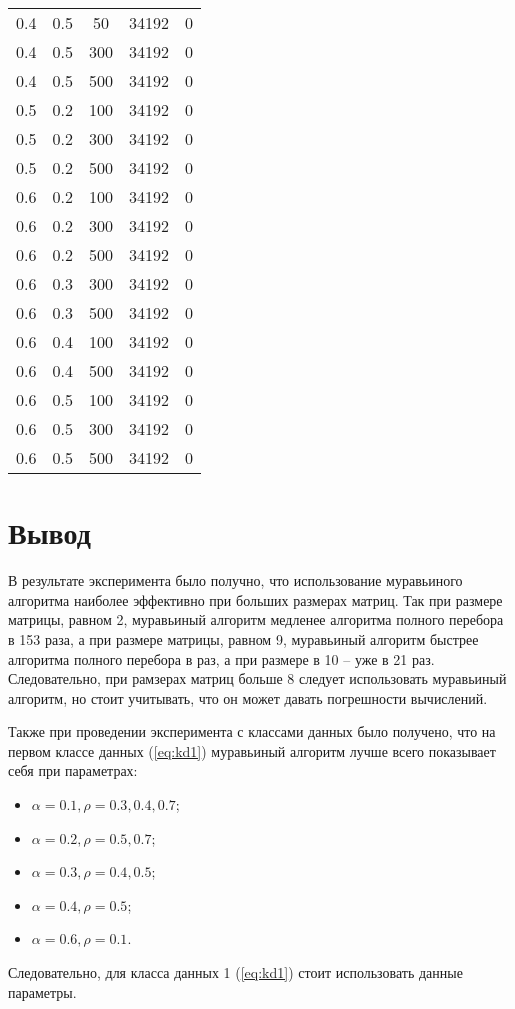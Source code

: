 \begin{center}
\begin{longtable}[c]{|c|c|c|c|c|}
		0.4 &  0.5 &   50 & 34192 &     0 \\
		0.4 &  0.5 &  300 & 34192 &     0 \\
		0.4 &  0.5 &  500 & 34192 &     0 \\ \hline
		0.5 &  0.2 &  100 & 34192 &     0 \\
		0.5 &  0.2 &  300 & 34192 &     0 \\
		0.5 &  0.2 &  500 & 34192 &     0 \\ \hline
		0.6 &  0.2 &  100 & 34192 &     0 \\
		0.6 &  0.2 &  300 & 34192 &     0 \\
		0.6 &  0.2 &  500 & 34192 &     0 \\ \hline
		0.6 &  0.3 &  300 & 34192 &     0 \\
		0.6 &  0.3 &  500 & 34192 &     0 \\ \hline
		0.6 &  0.4 &  100 & 34192 &     0 \\
		0.6 &  0.4 &  500 & 34192 &     0 \\ \hline
		0.6 &  0.5 &  100 & 34192 &     0 \\
		0.6 &  0.5 &  300 & 34192 &     0 \\
		0.6 &  0.5 &  500 & 34192 &     0 \\ \hline
	\end{longtable}
\end{center}

\section{Вывод}

В результате эксперимента было получно, что использование муравьиного алгоритма наиболее эффективно при больших размерах матриц. Так при размере матрицы, равном 2, муравьиный алгоритм медленее алгоритма полного перебора в 153 раза, а при размере матрицы, равном 9, муравьиный алгоритм быстрее алгоритма полного перебора в раз, а при размере в 10 -- уже в 21 раз. Следовательно, при рамзерах матриц больше 8 следует использовать муравьиный алгоритм, но стоит учитывать, что он может давать погрешности вычислений.

Также при проведении эксперимента с классами данных было получено, что на первом классе данных (\ref{eq:kd1}) муравьиный алгоритм лучше всего показывает себя при параметрах:
\begin{itemize}
	\item $\alpha = 0.1, \rho = 0.3, 0.4, 0.7$;
	\item $\alpha = 0.2, \rho = 0.5, 0.7$;
	\item $\alpha = 0.3, \rho = 0.4, 0.5$;
	\item $\alpha = 0.4, \rho = 0.5$;
	\item $\alpha = 0.6, \rho = 0.1$.
\end{itemize}  
Следовательно, для класса данных 1 (\ref{eq:kd1}) стоит использовать данные параметры. 

